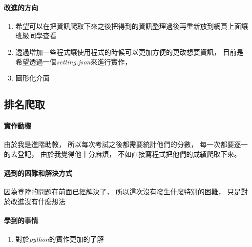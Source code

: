 \documentclass[12pt]{ctexart}
\begin{document}
\clearpage
\paragraph{改進的方向}
\begin{adjustwidth}{2em}{0em}
\begin{enumerate}
    \item
        希望可以在把資訊爬取下來之後把得到的資訊整理過後再重新放到網頁上面讓班級同學查看
    \item 
        透過增加一些程式讓使用程式的時候可以更加方便的更改想要資訊，
        目前是希望透過一個\textit{setting.json}來進行實作，
    \item 
        圖形化介面
\end{enumerate}
    
\end{adjustwidth}


\clearpage
\subsection{ 排名爬取 }

\paragraph{ 實作動機 }
\begin{adjustwidth}{2em}{0em}
    由於我是進階助教，
    所以每次考試之後都需要統計他們的分數，
    每一次都要逐一的去登記，
    由於我覺得他十分麻煩，
    不如直接寫程式把他們的成績爬取下來。
\end{adjustwidth}

\paragraph{ 遇到的困難和解決方式 }
\begin{adjustwidth}{2em}{0em}
    因為登陸的問題在前面已經解決了，
    所以這次沒有發生什麼特別的困難，
    只是對於改進沒有什麼想法
\end{adjustwidth}

\paragraph{ 學到的事情 }
\begin{enumerate}
    \item 
        對於\textit{python}的實作更加的了解
\end{enumerate}
\end{document}
